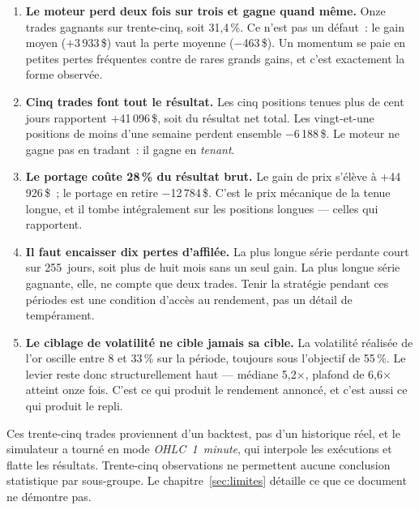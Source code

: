 \begin{enumerate}[leftmargin=1.4em, itemsep=0.45em]

\item \textbf{Le moteur perd deux fois sur trois et gagne quand même.} Onze
trades gagnants sur trente-cinq, soit 31,4\,\%. Ce n'est pas un défaut~: le gain
moyen ($+$3\,933\,\$) vaut  la perte moyenne ($-$463\,\$). Un
momentum se paie en petites pertes fréquentes contre de rares grands gains, et
c'est exactement la forme observée.

\item \textbf{Cinq trades font tout le résultat.} Les cinq positions tenues plus
de cent jours rapportent $+$41\,096\,\$, soit  du résultat net
total. Les vingt-et-une positions de moins d'une semaine perdent ensemble
$-$6\,188\,\$. Le moteur ne gagne pas en tradant~: il gagne en \emph{tenant}.

\item \textbf{Le portage coûte 28\,\% du résultat brut.} Le gain de prix
s'élève à $+$44\,926\,\$~; le portage en retire $-$12\,784\,\$. C'est le prix
mécanique de la tenue longue, et il tombe intégralement sur les positions
longues --- celles qui rapportent.

\item \textbf{Il faut encaisser dix pertes d'affilée.} La plus longue série
perdante court sur 255~jours, soit plus de huit mois sans un seul gain. La plus
longue série gagnante, elle, ne compte que deux trades. Tenir la stratégie
pendant ces périodes est une condition d'accès au rendement, pas un détail de
tempérament.

\item \textbf{Le ciblage de volatilité ne cible jamais sa cible.} La volatilité
réalisée de l'or oscille entre 8 et 33\,\% sur la période, toujours sous
l'objectif de 55\,\%. Le levier reste donc structurellement haut --- médiane
5,2$\times$, plafond de 6,6$\times$ atteint onze fois. C'est ce qui produit le
rendement annoncé, et c'est aussi ce qui produit le repli.

\end{enumerate}

\begin{warningbox}
Ces trente-cinq trades proviennent d'un backtest, pas d'un historique réel, et
le simulateur a tourné en mode \emph{OHLC~1~minute}, qui interpole les
exécutions et flatte les résultats. Trente-cinq observations ne permettent
aucune conclusion statistique par sous-groupe. Le chapitre~\ref{sec:limites}
détaille ce que ce document ne démontre pas.
\end{warningbox}


